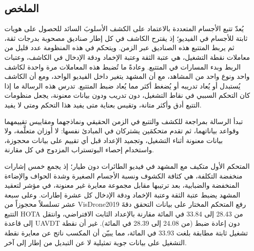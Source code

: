 \cleardoublepage
\pagestyle{empty}
\begin{otherlanguage}{arabic}
\chapter*{الملخص}
\thispagestyle{empty}

يُعدّ تتبع الأجسام المتعددة بالاعتماد على الكشف الأسلوبَ السائد للحصول على هويات ثابتة للأجسام في الفيديو؛ إذ يقترح الكاشف في كل إطار صناديق مصحوبة بدرجات ثقة، ثم يربط المتتبع هذه الصناديق عبر الزمن. ويتحكم في هذه المنظومة عدد قليل من معاملات نقطة التشغيل، هي عتبة الثقة وعتبة الإخماد ودقة الإدخال في الكاشف، وعتبات الربط وبدء المسارات في المتتبع. وعادةً ما تُضبط هذه المعاملات مرة واحدة لكاشف واحد ونوع واحد من المشاهد، مع أن المشهد يتغير داخل الفيديو الواحد، ومع أن الكاشف يُستبدل أو يُعاد تدريبه أو يُضغط أكثر مما يُعاد ضبط المتتبع. تدرس هذه الرسالة ما إذا كان التحكم السببي في نقاط التشغيل، دون تدريب ودون بيانات معنونة، يجعل منظومات التتبع أدق وأكثر متانة، وتقيس بعناية متى يفيد هذا التحكم ومتى لا يفيد.

تبدأ الرسالة بمراجعة للكشف والتتبع في الزمن الحقيقي ونماذجهما ومقاييس تقييمهما وقواعد بياناتهما، ثم تقدم متحكمَين يشتركان في المبادئ نفسها: لا أوزان متعلَّمة، ولا بيانات معنونة أثناء التشغيل، وتجميد الإعداد قبل أي تقييم على بيانات محجوزة، واستخدام إحصاء البوتستراب المزدوج في كل مقارنة.

المتحكم الأول متكيف مع المشهد في فيديو الطائرات دون طيار؛ إذ يجمع خمس إشارات منخفضة التكلفة، هي كثافة الكشوف ونسبة الأجسام الصغيرة وشدة الحواف والإضاءة المنخفضة والضبابية، بعد ترتيبها مقابل مجموعة معايرة غير معنونة، في مؤشر لتعقيد المشهد يضبط عتبة الثقة وعتبة الإخماد ودقة الإدخال كل عشرة إطارات. وعلى سبعة عشر تسلسلاً محجوزاً من \foreignlanguage{english}{VisDrone2019} رفع المتحكم المختار على بيانات التحقق دقةَ التتبع \foreignlanguage{english}{HOTA} من \foreignlanguage{english}{28.43} إلى \foreignlanguage{english}{33.84} في المائة مقارنة بالإعداد الثابت الافتراضي، وانتقل إلى قاعدة \foreignlanguage{english}{UAVDT} دون إعادة ضبط (من \foreignlanguage{english}{24.08} إلى \foreignlanguage{english}{28.39} في المائة). غير أن نقطة تشغيل ثابتة مطابقة بلغت \foreignlanguage{english}{33.93} في المائة، مما يبيّن أن المكسب ناتج عن معايرة نقطة التشغيل على بيانات جوية تمثيلية لا عن التبديل من إطار إلى آخر.


\end{otherlanguage}
